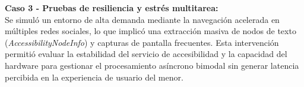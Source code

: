 \textbf{Caso 3 - Pruebas de resiliencia y estrés multitarea:} \\
Se simuló un entorno de alta demanda mediante la navegación acelerada en múltiples redes sociales, lo que implicó una extracción masiva de nodos de texto (\textit{AccessibilityNodeInfo}) y capturas de pantalla frecuentes. Esta intervención permitió evaluar la estabilidad del servicio de accesibilidad y la capacidad del hardware para gestionar el procesamiento asíncrono bimodal sin generar latencia percibida en la experiencia de usuario del menor.